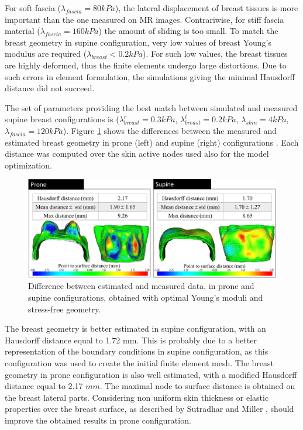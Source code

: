  

For soft fascia ($\lambda_{fascia} = 80kPa$), the lateral displacement of breast tissues is more important than the one measured on MR images. Contrariwise, for stiff fascia material ($\lambda_{fascia}=160 kPa$) the amount of sliding is too small. To match the breast geometry in supine configuration, very low values of breast Young's modulus are required ($\lambda_{breast}< 0.2kPa$). For such low values, the breast tissues are highly deformed, thus the finite elements undergo large distortions. Due to such errors in element formulation, the simulations giving the minimal Hausdorff distance did not succeed.   

The set of parameters providing the best match between simulated and measured supine breast configurations is ($\lambda_{breast}^r=0.3 kPa$, $\lambda_{breast}^l=0.2 kPa$, $\lambda_{skin}=4 kPa$, $\lambda_{fascia}=120 kPa$).  
\clearpage
Figure \ref{fig:geometryoptimizationresults} shows the differences between the measured and estimated breast geometry in prone (left) and supine (right) configurations . Each distance was computed over the skin active nodes used also for the model optimization. 

\begin{figure}[!h]
\centering
\includegraphics[width=\textwidth,keepaspectratio]{figures/optimizationresults.png} 
\caption{Difference  between estimated and measured data, in prone and supine configurations, obtained with optimal Young's moduli and stress-free geometry. }\label{fig:geometryoptimizationresults}
\end{figure}

The breast geometry is better estimated in supine configuration, with an Hausdorff distance equal to 1.72 mm. This is probably due to a better representation of the boundary conditions in supine configuration, as this configuration was used to create the initial finite element mesh. The breast geometry in prone configuration is also well estimated, with a modified Hausdorff distance equal to 2.17 $mm$. The maximal node to surface distance is obtained on the breast lateral parts.  Considering non uniform skin thickness or elastic properties over the breast surface, as described by Sutradhar and Miller \citep{sutradhar_vivo_2013}, should improve the obtained results in prone configuration. 





